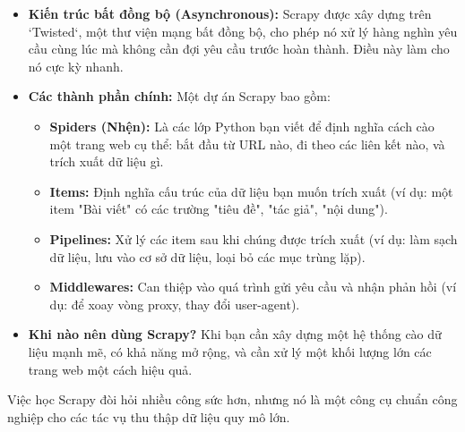 \begin{itemize}
    \item \textbf{Kiến trúc bất đồng bộ (Asynchronous):} Scrapy được xây dựng trên `Twisted`, một thư viện mạng bất đồng bộ, cho phép nó xử lý hàng nghìn yêu cầu cùng lúc mà không cần đợi yêu cầu trước hoàn thành. Điều này làm cho nó cực kỳ nhanh.
    \item \textbf{Các thành phần chính:} Một dự án Scrapy bao gồm:
        \begin{itemize}
            \item \textbf{Spiders (Nhện):} Là các lớp Python bạn viết để định nghĩa cách cào một trang web cụ thể: bắt đầu từ URL nào, đi theo các liên kết nào, và trích xuất dữ liệu gì.
            \item \textbf{Items:} Định nghĩa cấu trúc của dữ liệu bạn muốn trích xuất (ví dụ: một item "Bài viết" có các trường "tiêu đề", "tác giả", "nội dung").
            \item \textbf{Pipelines:} Xử lý các item sau khi chúng được trích xuất (ví dụ: làm sạch dữ liệu, lưu vào cơ sở dữ liệu, loại bỏ các mục trùng lặp).
            \item \textbf{Middlewares:} Can thiệp vào quá trình gửi yêu cầu và nhận phản hồi (ví dụ: để xoay vòng proxy, thay đổi user-agent).
        \end{itemize}
    \item \textbf{Khi nào nên dùng Scrapy?} Khi bạn cần xây dựng một hệ thống cào dữ liệu mạnh mẽ, có khả năng mở rộng, và cần xử lý một khối lượng lớn các trang web một cách hiệu quả.
\end{itemize}
Việc học Scrapy đòi hỏi nhiều công sức hơn, nhưng nó là một công cụ chuẩn công nghiệp cho các tác vụ thu thập dữ liệu quy mô lớn.